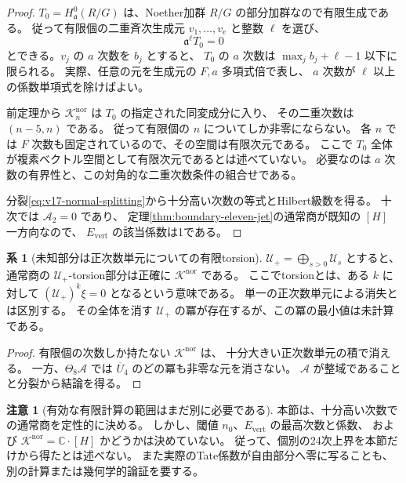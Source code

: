 \documentclass[a4paper,11pt]{ltjsarticle}
\theoremstyle{definition}
\newtheorem{remark}[theorem]{注意}
\newtheorem{corollary}[theorem]{系}
\begin{document}
\begin{proof}
$T_0=H^0_{\mathfrak a}(R/G)$ は、Noether加群 $R/G$ の部分加群なので有限生成である。
従って有限個の二重斉次生成元 $v_1,\ldots,v_e$ と整数 $\ell$ を選び、
\[
 \mathfrak a^\ell T_0=0
\]
とできる。$v_j$ の $a$ 次数を $b_j$ とすると、
$T_0$ の $a$ 次数は $\max_j b_j+\ell-1$ 以下に限られる。
実際、任意の元を生成元の $F,a$ 多項式倍で表し、
$a$ 次数が $\ell$ 以上の係数単項式を除けばよい。

前定理から $\mathcal K_n^{\mathrm{nor}}$ は $T_0$ の指定された同変成分に入り、
その二重次数は $(n-5,n)$ である。
従って有限個の $n$ についてしか非零にならない。
各 $n$ では $F$ 次数も固定されているので、その空間は有限次元である。
ここで $T_0$ 全体が複素ベクトル空間として有限次元であるとは述べていない。
必要なのは $a$ 次数の有界性と、この対角的な二重次数条件の組合せである。

分裂\eqref{eq:v17-normal-splitting}から十分高い次数の等式とHilbert級数を得る。
十次では $\mathcal A_2=0$ であり、
定理\ref{thm:boundary-eleven-jet}の通常商が既知の $[H]$ 一方向なので、
$E_{\mathrm{vert}}$ の該当係数は1である。
\end{proof}

\begin{corollary}[未知部分は正次数単元についての有限torsion]
\label{cor:v17-positive-unit-torsion}
$\mathcal U_+=\bigoplus_{s>0}\mathcal U_s$ とすると、
通常商の $\mathcal U_+$-torsion部分は正確に $\mathcal K^{\mathrm{nor}}$ である。
ここでtorsionとは、ある $k$ に対して $(\mathcal U_+)^k\xi=0$ となるという意味である。
単一の正次数単元による消失とは区別する。
その全体を消す $\mathcal U_+$ の冪が存在するが、この冪の最小値は未計算である。
\end{corollary}

\begin{proof}
有限個の次数しか持たない $\mathcal K^{\mathrm{nor}}$ は、
十分大きい正次数単元の積で消える。
一方、$\Theta_8\mathcal A$ では $\overline U_4$ のどの冪も非零な元を消さない。
$\mathcal A$ が整域であることと分裂から結論を得る。
\end{proof}

\begin{remark}[有効な有限計算の範囲はまだ別に必要である]
本節は、十分高い次数での通常商を定性的に決める。
しかし、閾値 $n_0$、$E_{\mathrm{vert}}$ の最高次数と係数、
および $\mathcal K^{\mathrm{nor}}=\mathbb C\cdot[H]$ かどうかは決めていない。
従って、個別の24次上界を本節だけから得たとは述べない。
また実際のTate係数が自由部分へ零に写ることも、別の計算または幾何学的論証を要する。
\end{remark}
\end{document}
